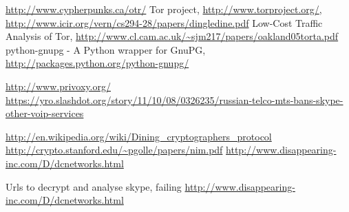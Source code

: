 \begin{thebibliography}{666}
 \url{http://www.cypherpunks.ca/otr/}
 Tor project, \url{http://www.torproject.org/},
    \url{http://www.icir.org/vern/cs294-28/papers/dingledine.pdf}
 Low-Cost Traffic Analysis of Tor,
    \url{http://www.cl.cam.ac.uk/~sjm217/papers/oakland05torta.pdf}
 python-gnupg - A Python wrapper for GnuPG,
    \url{http://packages.python.org/python-gnupg/}

 \url{http://www.privoxy.org/}
\url{https://yro.slashdot.org/story/11/10/08/0326235/russian-telco-mts-bans-skype-other-voip-services}

\url{http://en.wikipedia.org/wiki/Dining_cryptographers_protocol}
\url{http://crypto.stanford.edu/~pgolle/papers/nim.pdf}
\url{http://www.disappearing-inc.com/D/dcnetworks.html}

 Urls to decrypt and analyse skype, failing
\url{http://www.disappearing-inc.com/D/dcnetworks.html}



\end{thebibliography}
